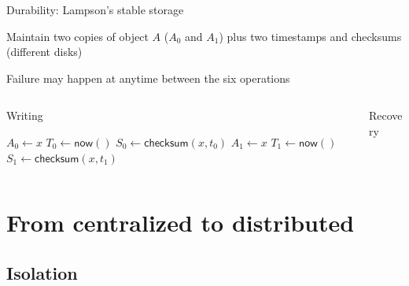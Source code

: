 \begin{frame}{Durability: Lampson's stable storage}

\BI
\item Maintain two copies of object $A$ ($A_0$ and $A_1$) plus two timestamps and checksums (different disks)
\item Failure may happen at anytime between the six operations
\EI

{\footnotesize

\begin{columns}[T]
\begin{column}{0.32\textwidth}
\begin{center}
\alert{Writing}
\end{center}
\vspace{-12pt}
\begin{Procedure}
\caption{$\textsc{update}(A, x)$}
$A_0 \gets x$\;
$T_0 \gets \textsf{now}()$\;
$S_0 \gets \textsf{checksum}(x, t_0)$\;
$A_1 \gets x$\;
$T_1 \gets \textsf{now}()$\;
$S_1 \gets \textsf{checksum}(x, t_1)$\;
\end{Procedure}
\end{column}
\hfill
\begin{column}{0.67\textwidth}
\begin{center}
\alert{Recovery}
\end{center}
\vspace{-12pt}
\begin{Procedure}
\caption{$\textsc{read}(A)$}
\end{Procedure}
\end{column}
\end{columns}
}
\end{frame}

\section{From centralized to distributed}

\subsection{Isolation}

